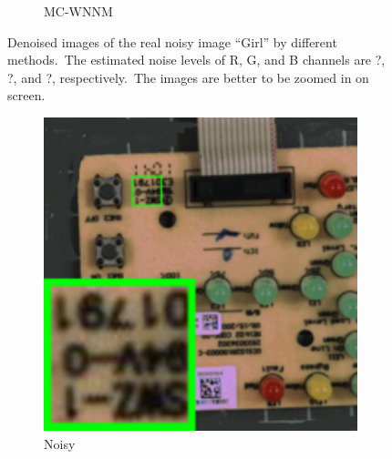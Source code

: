 \begin{figure}
\begin{subfigure}[t]{0.19\textwidth}
		\caption{MC-WNNM}
    \end{subfigure}
    \caption{Denoised images of the real noisy image ``Girl'' \cite{ncwebsite} by different methods.\ The estimated noise levels of R, G, and B channels are ?, ?, and ?, respectively.\ The images are better to be zoomed in on screen.}
    \label{fig4-11}
\end{figure}


\begin{figure}
    \centering
    \begin{subfigure}[t]{0.19\textwidth}
        \centering
        \includegraphics[width=1\textwidth]{images/mcwnnm/nc/resize_br_Noisy_circuit.png}
		\caption{Noisy}
    \end{subfigure}
    \hfill
    \begin{subfigure}[t]{0.19\textwidth}
        \centering

\end{subfigure}
\end{figure}

